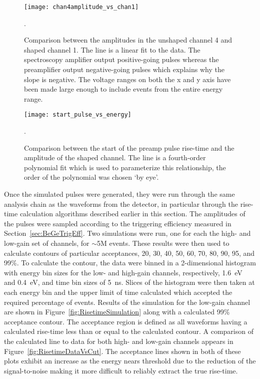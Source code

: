 					\begin{figure}
						\centering
						\texttt{[image: chan4amplitude\_vs\_chan1]}
						\caption[Comparison between the amplitudes in the unshaped and shaped BeGe channels]
						{Comparison between the amplitudes in the unshaped channel 4 and shaped channel 1.  											The line is a linear fit to the data.  The spectroscopy amplifier
						output positive-going pulses whereas the preamplifier output negative-going pulses which explains why the slope 
						is negative.  The voltage ranges on both the x and y axis have been made large enough to include events from the
						entire energy range.}
						\label{fig:Risetimechan2vschan4}.
					\end{figure}
					
					\begin{figure}
						\centering
						\texttt{[image: start\_pulse\_vs\_energy]}
						\caption[Comparison between the start of the preamp pulse rise-time and the amplitude of the shaped channel for the BeGe]
						{Comparison between the start of the preamp pulse rise-time and the amplitude of the shaped
						 channel.  The line is a fourth-order polynomial fit which is used to parameterize this relationship, the order
						 of the polynomial was chosen `by eye'.}
						\label{fig:TriggerPositionDependence}.
					\end{figure}					
	
	Once the simulated pulses were generated, they were run through the same analysis chain as the waveforms from the detector, in particular through the rise-time calculation algorithms described earlier in this section.  The amplitudes of the pulses were sampled according to the triggering efficiency measured in Section~\ref{sec:BeGeTrigEff}.  Two simulations were run, one for each the high- and low-gain set of channels, for $\sim$5M events.  These results were then used to calculate contours of particular acceptances, 20, 30, 40, 50, 60, 70, 80, 90, 95, and 99\%.  To calculate the contour, the data were binned in a 2-dimensional histogram with energy bin sizes for the low- and high-gain channels, respectively, 1.6~eV and 0.4~eV, and time bin sizes of 5~ns.  Slices of the histogram were then taken at each energy bin and the upper limit of time calculated which accepted the required percentage of events.  Results of the simulation for the low-gain channel are shown in Figure~\ref{fig:RisetimeSimulation} along with a calculated 99\% acceptance contour.  The acceptance region is defined as all waveforms having a calculated rise-time less than or equal to the calculated contour.  A comparison of the calculated line to data for both high- and low-gain channels appears in Figure~\ref{fig:RisetimeDataVsCut}.  The acceptance lines shown in both of these plots exhibit an increase as the energy nears threshold due to the reduction of the signal-to-noise making it more difficult to reliably extract the true rise-time.
					
